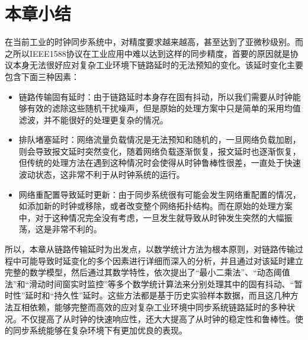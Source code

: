 \section{本章小结}
在当前工业的时钟同步系统中，对精度要求越来越高，甚至达到了亚微秒级别。而之所以IEEE1588协议在工业应用中难以达到这样的同步精度，首要的原因就是协议本身无法很好应对复杂工业环境下链路延时的无法预知的变化。该延时变化主要包含下面三种因素：
\begin{itemize}[noitemsep,topsep=0pt,parsep=0pt,partopsep=0pt]
	\item 链路传输固有延时：由于链路延时本身存在固有抖动，所以我们需要从时钟能够有效的滤除这些随机干扰噪声，但是原始的处理方案中只是简单的采用均值滤波，并不能很好的处理更复杂的情况。
	\item 排队堵塞延时：网络流量负载情况是无法预知和随机的，一旦网络负载加剧，则会导致报文延时突然变化，随着网络负载逐渐恢复，报文延时也逐渐恢复，但传统的处理方法在遇到这种情况时会使得从时钟鲁棒性很差，一直处于快速波动状态，这非常不利于从时钟系统的运行。
	\item 网络重配置导致延时更新：由于同步系统很有可能会发生网络重配置的情况，如添加新的时钟或移除，或者改变整个网络拓扑结构。而在原始的处理方案中，对于这种情况完全没有考虑，一旦发生就导致从时钟发生突然的大幅振荡，这是非常不利的。
\end{itemize}

所以，本章从链路传输延时为出发点，以数学统计方法为根本原则，对链路传输过程中可能导致时延变化的多个因素进行详细而深入的分析，并且通过对该延时建立完整的数学模型，然后通过其数学特性，依次提出了“最小二乘法”、“动态阈值法”和“滑动时间窗实时监控”等多个数学统计算法来分别处理其中的固有抖动、“暂时性”延时和“持久性”延时。这些方法都是基于历史实验样本数据，而且这几种方法互相依赖，能够完整而高效的应对复杂工业环境中同步系统链路延时的多种状况。不仅提高了从时钟的快速响应性，还大大提高了从时钟的稳定性和鲁棒性。使的同步系统能够在复杂环境下有更加优良的表现。





